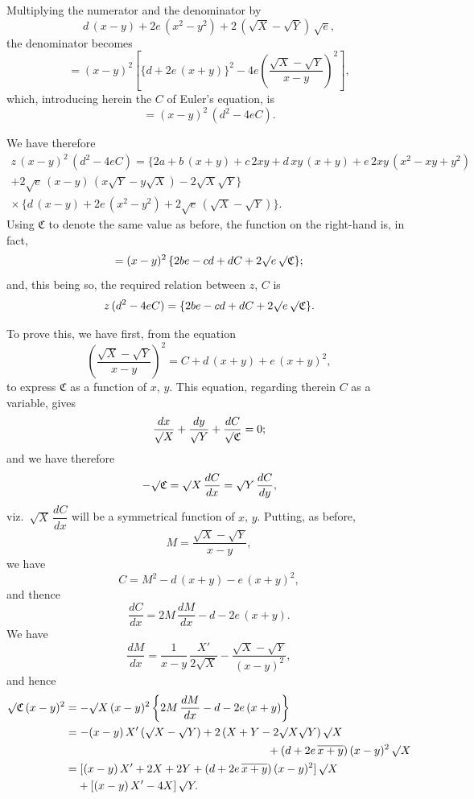 \documentclass[11pt,a4paper]{book}
\begin{document}
Multiplying the numerator and the denominator by
\[
d\,(x-y) + 2e\,(x^2-y^2) + 2\,(\surd X - \surd Y)\,\surd e,
\]
the denominator becomes
\[
= (x-y)^2\left[\{d + 2e\,(x+y)\}^2 - 4e\left(\frac{\surd X - \surd Y}{x-y}\right)^2\right],
\]
which, introducing herein the $C$ of Euler's equation, is
\[
= (x-y)^2\,(d^2 - 4eC).
\]

We have therefore
\begin{multline*}
z\,(x-y)^2\,(d^2 - 4eC) = \{2a + b\,(x+y) + c\,2xy + d\,xy\,(x+y) + e\,2xy\,(x^2-xy+y^2) \\ + 2\surd e\,(x-y)\,(x\surd Y - y\surd X) - 2\surd X\surd Y\} \\ \times\,\{d\,(x-y) + 2e\,(x^2-y^2) + 2\surd e\,(\surd X - \surd Y)\}.
\end{multline*}
Using $\mathfrak{C}$ to denote the same value as before, the function on the right-hand is, in fact,
\[
= (x-y)^2\,\{2be - cd + dC + 2\surd e\,\surd\mathfrak{C}\};
\]
and, this being so, the required relation between $z$, $C$ is
\[
z\,(d^2 - 4eC) = \{2be - cd + dC + 2\surd e\,\surd\mathfrak{C}\}.
\]

\newpage

\noindent
To prove this, we have first, from the equation
\[
\left(\frac{\surd X - \surd Y}{x-y}\right)^2 = C + d\,(x+y) + e\,(x+y)^2,
\]
to express $\mathfrak{C}$ as a function of $x$, $y$. This equation, regarding therein $C$ as a variable, gives
\[
\frac{dx}{\surd X} + \frac{dy}{\surd Y} + \frac{dC}{\surd\mathfrak{C}} = 0;
\]
and we have therefore
\[
-\surd\mathfrak{C} = \surd X\,\frac{dC}{dx} = \surd Y\,\frac{dC}{dy},
\]
viz.\ $\surd X\,\dfrac{dC}{dx}$ will be a symmetrical function of $x$, $y$. Putting, as before,
\[
M = \frac{\surd X - \surd Y}{x-y},
\]
we have
\[
C = M^2 - d\,(x+y) - e\,(x+y)^2,
\]
and thence
\[
\frac{dC}{dx} = 2M\,\frac{dM}{dx} - d - 2e\,(x+y).
\]
We have
\[
\frac{dM}{dx} = \frac{1}{x-y}\,\frac{X'}{2\surd X} - \frac{\surd X - \surd Y}{(x-y)^2},
\]
and hence
\begin{align*}
\surd\mathfrak{C}\,(x-y)^2 &= -\surd X\,(x-y)^2\left\{2M\,\frac{dM}{dx} - d - 2e\,(x+y)\right\} \\
&= -(x-y)\,X'\,(\surd X - \surd Y) + 2\,(X+Y-2\surd X\surd Y)\,\surd X \\
&\qquad\qquad\qquad\qquad\qquad\qquad\qquad\qquad\qquad + (d+2e\,\overline{x+y})\,(x-y)^2\,\surd X \\
&= \phantom{}[(x-y)\,X' + 2X + 2Y + (d+2e\,\overline{x+y})\,(x-y)^2]\,\surd X \\
&\phantom{=\;} + [(x-y)\,X' - 4X]\,\surd Y.
\end{align*}
\end{document}
